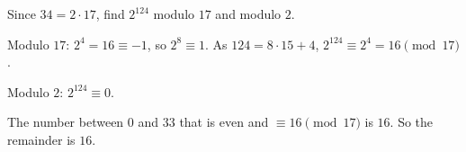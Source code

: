 Since $34=2\cdot17$, find $2^{124}$ modulo $17$ and modulo $2$.

Modulo $17$: $2^4=16\equiv-1$, so $2^8\equiv1$. As $124=8\cdot15+4$, $2^{124}\equiv2^4=16\pmod{17}$.

Modulo $2$: $2^{124}\equiv0$.

The number between $0$ and $33$ that is even and $\equiv16\pmod{17}$ is $16$. So the remainder is $\boxed{16}$.
